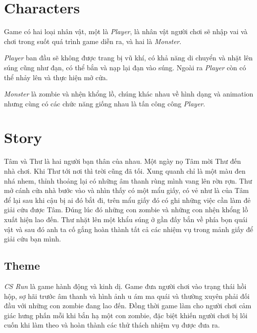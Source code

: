 \documentclass[14pt,a4paper]{extreport}
\begin{document}
\chapter{Characters}
Game có hai loại nhân vật, một là \textit{Player}, là nhân vật người chơi sẽ nhập vai và chơi trong suốt quá trình game diễn ra, và hai là \textit{Monster}. 

\textit{Player} ban đầu sẽ không được trang bị vũ khí, có khả năng di chuyển và nhặt lên súng cũng như đạn, có thể bắn và nạp lại đạn vào súng. Ngoài ra \textit{Player} còn có thể nhảy lên và thực hiện mở cửa. 

\textit{Monster} là zombie và nhện khổng lồ, chúng khác nhau về hình dạng và animation nhưng cùng có các chức năng giống nhau là tấn công công \textit{Player}.

\chapter{Story}
Tâm và Thư là hai người bạn thân của nhau. Một ngày nọ Tâm mời Thư đến nhà chơi. Khi Thư tới nơi thì trời cũng đã tối. Xung quanh chỉ là một màu đen nhá nhem, thỉnh thoảng lại có những âm thanh rùng mình vang lên rờn rợn. Thư mở cánh cửa nhà bước vào và nhìn thấy có một mẩu giấy, có vẻ như là của Tâm để lại sau khi cậu bị ai đó bắt đi, trên mẩu giấy đó có ghi những việc cần làm đẻ giải cứu được Tâm. Đúng lúc đó những con zombie và những con nhện khổng lồ xuất hiện lao đến. Thư nhặt lên một khẩu súng ở gần đấy bắn về phía bọn quái vật và sau đó anh ta cố gắng hoàn thành tất cả các nhiệm vụ trong mảnh giấy để giải cứu bạn mình.


\section{Theme}
\textit{CS Run} là game hành động và kinh dị. Game đưa người chơi vào trạng thái hồi hộp, sợ hãi trước âm thanh và hình ảnh u ám ma quái và thường xuyên phải đối đầu với những con zombie đang lao đến. Đồng thời game làm cho người chơi cảm giác hưng phấn mỗi khi bắn hạ một con zombie, đặc biệt khiến người chơi bị lôi cuốn khi làm theo và hoàn thành các thử thách nhiệm vụ được đưa ra.
\end{document}

